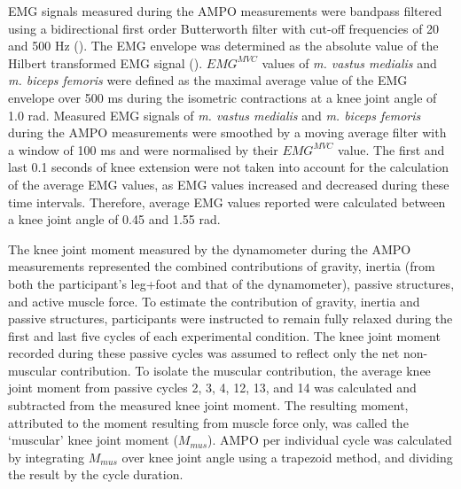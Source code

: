 \documentclass[
  11pt,
  a4paper]{article}
\begin{document}
EMG signals measured during the AMPO measurements were bandpass filtered
using a bidirectional first order Butterworth filter with cut-off
frequencies of 20 and 500 Hz
(). The EMG
envelope was determined as the absolute value of the Hilbert transformed
EMG signal ().
\(EMG^{MVC}\) values of \emph{m. vastus medialis} and \emph{m. biceps
femoris} were defined as the maximal average value of the EMG envelope
over 500 ms during the isometric contractions at a knee joint angle of
1.0 rad. Measured EMG signals of \emph{m. vastus medialis} and \emph{m.
biceps femoris} during the AMPO measurements were smoothed by a moving
average filter with a window of 100 ms and were normalised by their
\(EMG^{MVC}\) value. The first and last 0.1 seconds of knee extension
were not taken into account for the calculation of the average EMG
values, as EMG values increased and decreased during these time
intervals. Therefore, average EMG values reported were calculated
between a knee joint angle of 0.45 and 1.55 rad.

The knee joint moment measured by the dynamometer during the AMPO
measurements represented the combined contributions of gravity, inertia
(from both the participant's leg+foot and that of the dynamometer),
passive structures, and active muscle force. To estimate the
contribution of gravity, inertia and passive structures, participants
were instructed to remain fully relaxed during the first and last five
cycles of each experimental condition. The knee joint moment recorded
during these passive cycles was assumed to reflect only the net
non-muscular contribution. To isolate the muscular contribution, the
average knee joint moment from passive cycles 2, 3, 4, 12, 13, and 14
was calculated and subtracted from the measured knee joint moment. The
resulting moment, attributed to the moment resulting from muscle force
only, was called the `muscular' knee joint moment (\(M_{mus}\)). AMPO
per individual cycle was calculated by integrating \(M_{mus}\) over knee
joint angle using a trapezoid method, and dividing the result by the
cycle duration.
\end{document}
